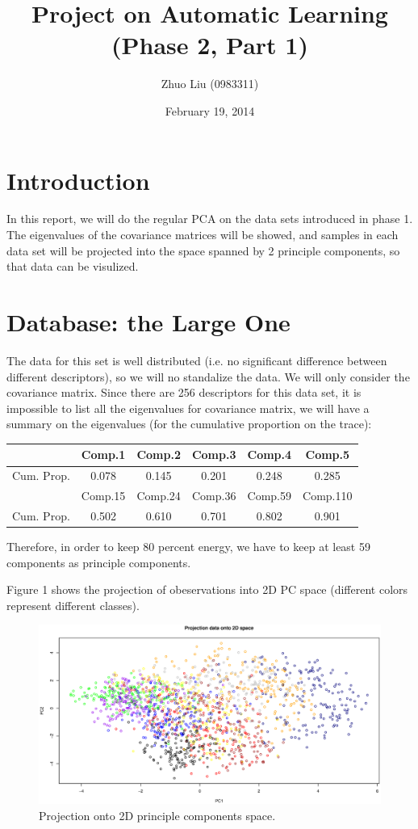 \documentclass{article}
\author{Zhuo Liu (0983311)}
\title{Project on Automatic Learning (Phase 2, Part 1)}
\date{February 19, 2014}
\begin{document}
\maketitle


\section{Introduction}

In this report, we will do the regular PCA on the data sets introduced in phase 1. The eigenvalues of the covariance matrices will be showed, and
samples in each data set will be projected into the space spanned by 2 principle components, so that data can be visulized.

\goodbreak

\section{Database: the Large One}

The data for this set is well distributed (i.e. no significant difference between different descriptors), so we will no standalize the data. We will
only consider the covariance matrix. Since there are 256 descriptors for this data set, it is impossible to list all the eigenvalues for covariance
matrix, we will have a summary on the eigenvalues (for the cumulative proportion on the trace):

 \begin{tabular}{|c|c|c|c|c|c|}
  \hline
                        & Comp.1 & Comp.2 & Comp.3 & Comp.4 & Comp.5 \\ \hline
  Cum. Prop. & 0.078 & 0.145 & 0.201 & 0.248 & 0.285 \\ \hline
                        & Comp.15 & Comp.24 & Comp.36 & Comp.59 & Comp.110 \\ \hline
  Cum. Prop. & 0.502 & 0.610 & 0.701 & 0.802 & 0.901 \\ \hline
 \end{tabular}
 
Therefore, in order to keep 80 percent energy, we have to keep at least 59 components as principle components.

Figure 1 shows the projection of obeservations into 2D PC space (different colors represent different classes).

\begin{figure}[htp]
\centering
\includegraphics[width=12.1cm]{large_pca_projection_2D.eps}
\caption{Projection onto 2D principle components space.}
\end{figure}
\end{document}
